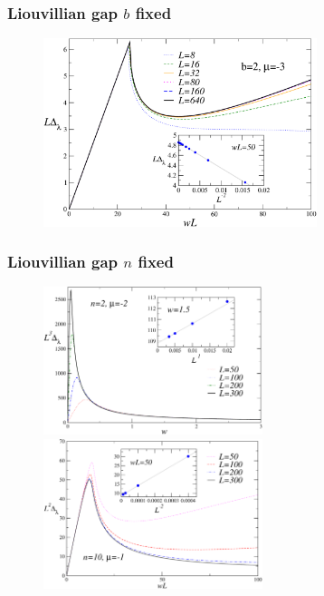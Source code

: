 \begin{frame}
	\frametitle{Liouvillian gap $b$ fixed}
\begin{figure}
    \centering
    \includegraphics[width=8cm]{imm/scalingDeltaapbc.pdf}
    \label{fig_ratelatetime}
\end{figure}

\end{frame}

\begin{frame}
	\frametitle{Liouvillian gap $n$ fixed}
\begin{figure}[!b]
    \centering
    \includegraphics[width=6.4cm]{imm/delantipk0bl2L3Dw.pdf}
    \includegraphics[width=6.4cm]{imm/scalingDeltanfixedmuminus1.pdf}
	\label{fig_scaling_delta_apbc}
\end{figure}

\end{frame}

